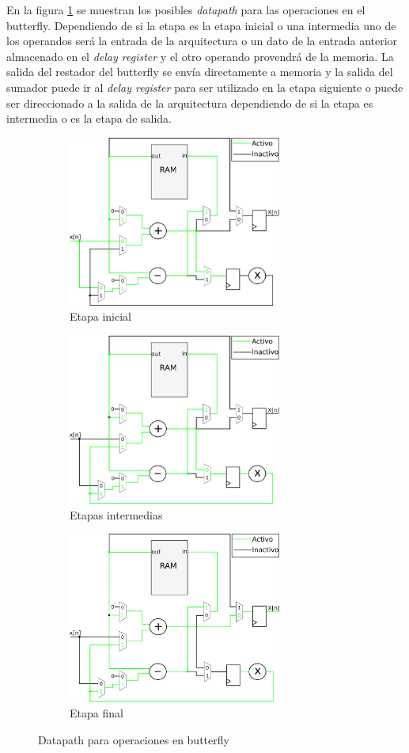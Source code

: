 En la figura \ref{fig:datapathBut} se muestran los posibles \textit{datapath} para las operaciones en el
butterfly. Dependiendo de si la etapa es la etapa inicial o una intermedia uno de los operandos será
la entrada de la arquitectura o un dato de la entrada anterior almacenado en el \textit{delay
register} y el otro operando provendrá de la memoria. La salida del restador del butterfly se envía
directamente a memoria y la salida del sumador puede ir al \textit{delay register} para ser
utilizado en la etapa siguiente o puede ser direccionado a la salida de la arquitectura dependiendo
de si la etapa es intermedia o es la etapa de salida.

\begin{figure}[htb!]
        \centering
        \begin{subfigure}{\columnwidth}\centering
        \includegraphics[width=7cm]{./figures/datapath_but1.png}
        \caption{Etapa inicial}
        \end{subfigure}
        \begin{subfigure}{\columnwidth}\centering
        \includegraphics[width=7cm]{./figures/datapath_butint.png}
        \caption{Etapas intermedias}
        \end{subfigure}
        \begin{subfigure}{\columnwidth}\centering
        \includegraphics[width=7cm]{./figures/datapath_butf.png}
        \caption{Etapa final}
        \end{subfigure}
        \caption{Datapath para operaciones en butterfly}
        \label{fig:datapathBut}
\end{figure}

